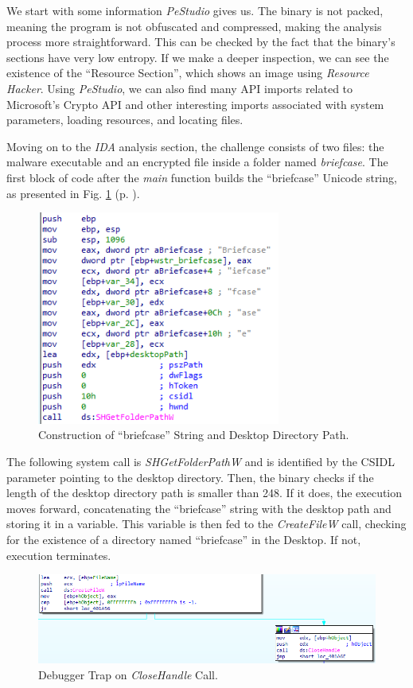 We start with some information \textit{PeStudio} gives us. The binary is not packed, meaning the program is not obfuscated and compressed, making the analysis process more straightforward. This can be checked by the fact that the binary's sections have very low entropy. If we make a deeper inspection, we can see the existence of the ``Resource Section'', which shows an image using \textit{Resource Hacker}. Using \textit{PeStudio}, we can also find many API imports related to Microsoft's Crypto API and other interesting imports associated with system parameters, loading resources, and locating files.

Moving on to the \textit{IDA} analysis section, the challenge consists of two files: the malware executable and an encrypted file inside a folder named \textit{briefcase}. The first block of code after the \textit{main} function builds the ``briefcase'' Unicode string, as presented in Fig. \ref{fig:ida_1} (p. \pageref{fig:ida_1}).

\begin{figure}[H]
    \includegraphics[width=8cm]{figures/ida_1.png}
    \caption{Construction of ``briefcase'' String and Desktop Directory Path.}
    \label{fig:ida_1}
\end{figure}

The following system call is \textit{SHGetFolderPathW} and is identified by the CSIDL parameter pointing to the desktop directory. Then, the binary checks if the length of the desktop directory path is smaller than 248. If it does, the execution moves forward, concatenating the ``briefcase'' string with the desktop path and storing it in a variable. This variable is then fed to the \textit{CreateFileW} call, checking for the existence of a directory named ``briefcase'' in the Desktop. If not, execution terminates. 

\begin{figure}[H]
    \includegraphics[width=12cm]{figures/ida_2.png}
    \caption{Debugger Trap on \textit{CloseHandle} Call.}
    \label{fig:ida_2}
\end{figure}

